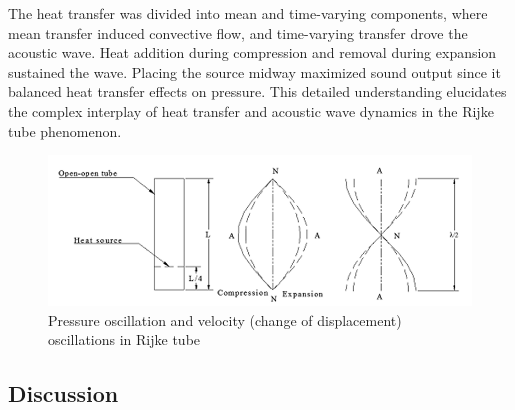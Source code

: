 \documentclass[8pt]{article} %
\begin{document}
The heat transfer was divided into mean and time-varying components, where mean transfer induced convective flow, and time-varying transfer drove the acoustic wave. Heat addition during compression and removal during expansion sustained the wave. Placing the source midway maximized sound output since it balanced heat transfer effects on pressure. This detailed understanding elucidates the complex interplay of heat transfer and acoustic wave dynamics in the Rijke tube phenomenon.\cite{Rijke Tube Paper}

\begin{figure}[H] 
\centering
\includegraphics[width=0.6\columnwidth]{./rijketheory.png}
\caption{Pressure oscillation and velocity (change of displacement) oscillations in Rijke tube}
\label{fig:Pressure oscillation and velocity (change of displacement) oscillations in Rijke tube}
\end{figure}
 

\subsection{Discussion}
\end{document}
